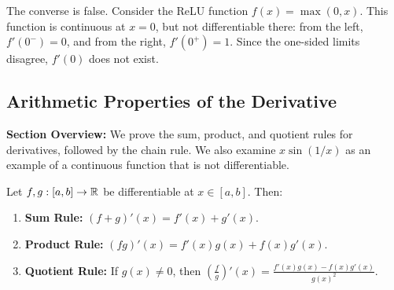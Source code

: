 \documentclass[../master/master.tex]{subfiles}
\begin{document}
\begin{example}
The converse is false. Consider the ReLU function $f(x) = \max(0, x)$. This function is continuous at $x = 0$, but not differentiable there: from the left, $f'(0^-) = 0$, and from the right, $f'(0^+) = 1$. Since the one-sided limits disagree, $f'(0)$ does not exist.
\begin{center}
\end{center}
\end{example}

\subsection{Arithmetic Properties of the Derivative}

\begin{summarybox}
\textbf{Section Overview:} We prove the sum, product, and quotient rules for derivatives, followed by the chain rule. We also examine $x\sin(1/x)$ as an example of a continuous function that is not differentiable.
\end{summarybox}

\begin{theorem}
Let $f, g: [a,b] \to \mathbb{R}$ be differentiable at $x \in [a,b]$. Then:
\begin{enumerate}[label=(\alph*)]
  \item \textbf{Sum Rule:} $(f + g)'(x) = f'(x) + g'(x)$.
  \item \textbf{Product Rule:} $(fg)'(x) = f'(x)g(x) + f(x)g'(x)$.
  \item \textbf{Quotient Rule:} If $g(x) \neq 0$, then $\displaystyle\left(\frac{f}{g}\right)'(x) = \frac{f'(x)g(x) - f(x)g'(x)}{g(x)^2}$.
\end{enumerate}
\end{theorem}
\end{document}
